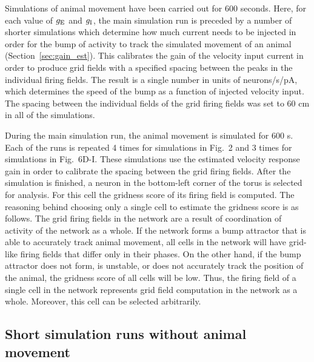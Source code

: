 \documentclass[a4paper,12pt]{article}
\newcommand{\ssc}[3]{\ensuremath{#1_{\text{#2}_{\text{#3}}}}}
\newcommand{\gE      }{\ssc{g}      {\scriptsize{E}}{}}
\newcommand{\gI      }{\ssc{g}      {\scriptsize{I}}{}}
\begin{document}
Simulations of animal movement have been carried out for 600 seconds.  Here,
for each value of $\gE$ and $\gI$, the main simulation run is preceded by a
number of shorter simulations which determine how much current needs to be
injected in order for the bump of activity to track the simulated movement of
an animal (Section~\ref{sec:gain_est}). This calibrates the gain of the
velocity input current in order to produce grid fields with a specified spacing
between the peaks in the individual firing fields. The result is a single
number in units of neurons/s/pA, which determines the speed of the bump as a
function of injected velocity input. The spacing between the individual fields
of the grid firing fields was set to 60 cm in all of the simulations.

During the main simulation run, the animal movement is simulated for 600 s.
Each of the runs is repeated 4 times for simulations in Fig.~2 and 3 times
for simulations in Fig.~6D-I. These simulations use the estimated velocity
response gain in order to calibrate the spacing between the grid firing fields.
After the simulation is finished, a neuron in the bottom-left corner of the
torus is selected for analysis. For this cell the gridness score of its firing
field is computed. The reasoning behind choosing only a single cell to estimate
the gridness score is as follows. The grid firing fields in the network are a
result of coordination of activity of the network as a whole. If the network
forms a bump attractor that is able to accurately track animal movement, all
cells in the network will have grid-like firing fields that differ only in
their phases. On the other hand, if the bump attractor does not form, is
unstable, or does not accurately track the position of the animal, the gridness
score of all cells will be low.  Thus, the firing field of a single cell in the
network represents grid field computation in the network as a whole.  Moreover,
this cell can be selected arbitrarily.


\subsection{Short simulation runs without animal movement} \label{sec:noise_short_sims}
\end{document}
